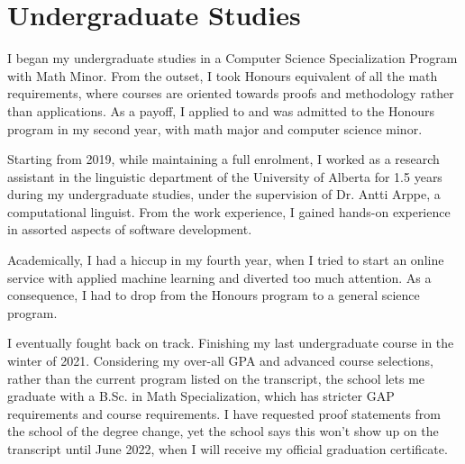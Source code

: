\section*{Undergraduate Studies}

I began my undergraduate studies in a Computer Science Specialization Program with Math Minor.
From the outset, I took Honours equivalent of all the math requirements,
where courses are oriented towards proofs and methodology rather than applications.
As a payoff, I applied to and was admitted to the Honours program in my second year,
with math major and computer science minor.

Starting from 2019, while maintaining a full enrolment,
I worked as a research assistant in the linguistic department of the University of Alberta for 1.5 years during my undergraduate studies,
under the supervision of Dr. Antti Arppe, a computational linguist.
From the work experience,
I gained hands-on experience in assorted aspects of software development.

Academically, I had a hiccup in my fourth year,
when I tried to start an online service with applied machine learning
and diverted too much attention.
As a consequence,
I had to drop from the Honours program to a general science program.

I eventually fought back on track.
Finishing my last undergraduate course in the winter of 2021.
Considering my over-all GPA and advanced course selections,
rather than the current program listed on the transcript,
the school lets me graduate with a B.Sc. in Math Specialization,
which has stricter GAP requirements and course requirements.
I have requested proof statements from the school of the degree change,
yet the school says this won't show up on the transcript until June 2022,
when I will receive my official graduation certificate.
